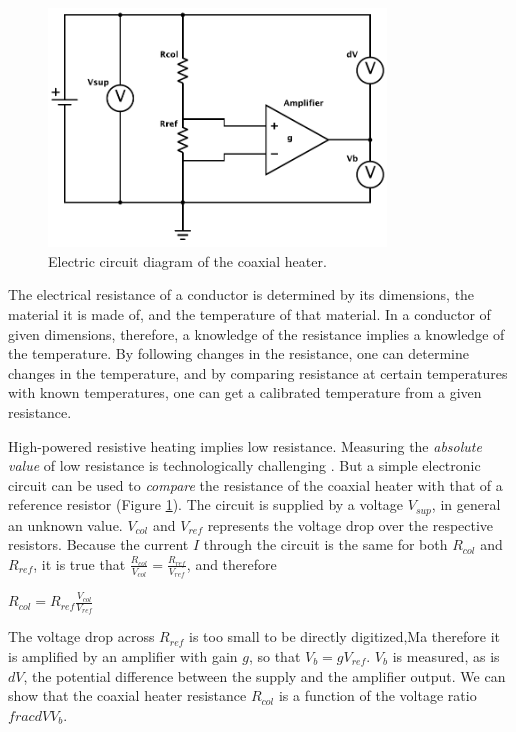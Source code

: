 \begin{figure}[htbp]
	\centering
	\includegraphics[width=0.8\textwidth]{Figures/Column-Heater.pdf}
	\decoRule
	\caption[Coaxial heater resistance heater]{\label{fig:HeaterDiagram}Electric circuit diagram of the coaxial heater.}
\end{figure}

The electrical resistance of a conductor is determined by its dimensions, the
material it is made of, and the temperature of that material. In a conductor of
given dimensions, therefore, a knowledge of the resistance implies a knowledge
of the temperature. By following changes in the resistance, one can determine
changes in the temperature, and by comparing resistance at certain temperatures
with known temperatures, one can get a calibrated temperature from a given
resistance.

High-powered resistive heating implies low resistance. Measuring the
\textit{absolute value} of low resistance is technologically challenging
\autocite{Dyos2012}. But a simple electronic circuit can be used to
\textit{compare} the resistance of the coaxial heater with that of a reference
resistor (Figure \ref{fig:HeaterDiagram}). The circuit is supplied by a voltage
\(V_{sup}\), in general an unknown value.
\(V_{col}\) and \(V_{ref}\) represents the voltage drop over the respective
resistors. Because the current \(I\) through the circuit is the same for both
\(R_{col}\) and \(R_{ref}\), it is true that
\(\frac{R_{col}}{V_{col}} = \frac{ R_{ref} }{ V_{ref} }\), and therefore

\(R_{col} = R_{ref}\frac{V_{col}}{V_{ref}}\)

The voltage drop across $R_{ref}$ is too small to be directly digitized,Ma
therefore it is amplified by an amplifier with gain $g$, so that $V_b =
gV_{ref}$. $V_b$ is measured, as is $dV$, the potential difference between the
supply and the amplifier output. We can show that the coaxial heater resistance
\(R_{col}\) is a function of the voltage ratio \(frac{dV}{V_b}\).

